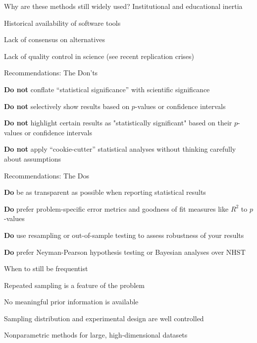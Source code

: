 \documentclass[12pt,aspectratio=169]{beamer}
\begin{document}
\begin{frame}{Why are these methods still widely used?}
    Institutional and educational inertia
    \newline\pause
    
    Historical availability of software tools
    \newline\pause
    
    Lack of consensus on alternatives
    \newline\pause
    
    Lack of quality control in science (see recent replication crises)
\end{frame}

\begin{frame}{Recommendations: The Don'ts}

\textbf{Do not} conflate ``statistical significance'' with scientific significance
\pause\newline

\textbf{Do not} selectively show results based on $p$-values or confidence intervals
\pause\newline

\textbf{Do not} highlight certain results as "statistically significant" based on their $p$-values or confidence intervals

\textbf{Do not} apply ``cookie-cutter'' statistical analyses without thinking carefully about assumptions

\end{frame}

\begin{frame}{Recommendations: The Dos}

\textbf{Do} be as transparent as possible when reporting statistical results
\pause\newline

\textbf{Do} prefer problem-specific error metrics and goodness of fit measures like $R^2$ to $p$-values
\pause\newline

\textbf{Do} use resampling or out-of-sample testing to assess robustness of your results
\pause\newline

\textbf{Do} prefer Neyman-Pearson hypothesis testing or Bayesian analyses over NHST

\end{frame}

\begin{frame}{When to still be frequentist}

Repeated sampling is a feature of the problem
\pause\newline

No meaningful prior information is available
\pause\newline

Sampling distribution and experimental design are well controlled
\pause\newline

Nonparametric methods for large, high-dimensional datasets

\end{frame}
\end{document}

